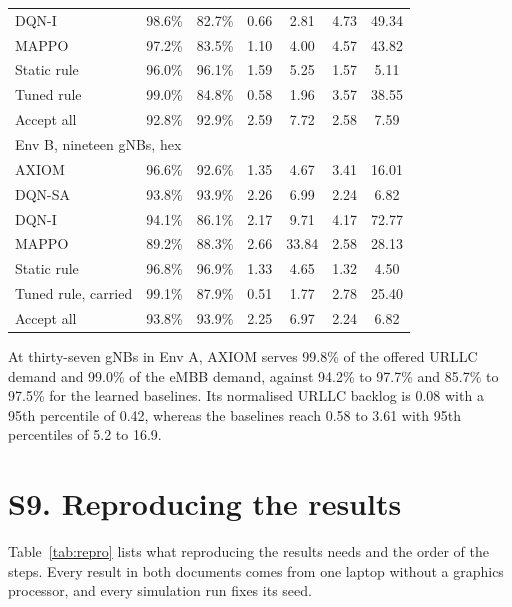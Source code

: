 \documentclass[9pt]{extarticle}
\begin{document}
\begin{table}[!htbp]
\begin{minipage}[t]{0.49\textwidth}
{\begin{tabular}{lcccccc}
DQN-I & 98.6\% & 82.7\% & 0.66 & 2.81 & 4.73 & 49.34 \\
MAPPO & 97.2\% & 83.5\% & 1.10 & 4.00 & 4.57 & 43.82 \\
Static rule & 96.0\% & 96.1\% & 1.59 & 5.25 & 1.57 & 5.11 \\
Tuned rule & 99.0\% & 84.8\% & 0.58 & 1.96 & 3.57 & 38.55 \\
Accept all & 92.8\% & 92.9\% & 2.59 & 7.72 & 2.58 & 7.59 \\
\midrule
\multicolumn{7}{l}{Env B, nineteen gNBs, hex} \\
AXIOM & 96.6\% & 92.6\% & 1.35 & 4.67 & 3.41 & 16.01 \\
DQN-SA & 93.8\% & 93.9\% & 2.26 & 6.99 & 2.24 & 6.82 \\
DQN-I & 94.1\% & 86.1\% & 2.17 & 9.71 & 4.17 & 72.77 \\
MAPPO & 89.2\% & 88.3\% & 2.66 & 33.84 & 2.58 & 28.13 \\
Static rule & 96.8\% & 96.9\% & 1.33 & 4.65 & 1.32 & 4.50 \\
Tuned rule, carried & 99.1\% & 87.9\% & 0.51 & 1.77 & 2.78 & 25.40 \\
Accept all & 93.8\% & 93.9\% & 2.25 & 6.97 & 2.24 & 6.82 \\
\bottomrule
\end{tabular}}
\end{minipage}
\end{table}

At thirty-seven gNBs in Env A, AXIOM serves 99.8\% of the offered URLLC demand and 99.0\% of the eMBB demand, against 94.2\% to 97.7\% and 85.7\% to 97.5\% for the learned baselines. Its normalised URLLC backlog is 0.08 with a 95th percentile of 0.42, whereas the baselines reach 0.58 to 3.61 with 95th percentiles of 5.2 to 16.9.

\section*{S9. Reproducing the results}
Table~\ref{tab:repro} lists what reproducing the results needs and the order of the steps. Every result in both documents comes from one laptop without a graphics processor, and every simulation run fixes its seed.
\end{document}
